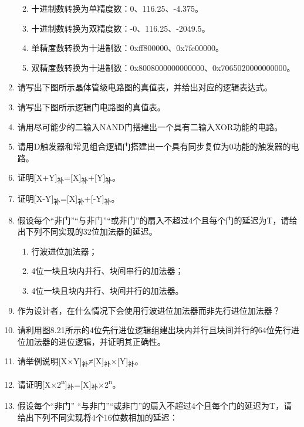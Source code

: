 \documentclass[]{ctexbook}
\providecommand{\tightlist}{%
  \setlength{\itemsep}{0pt}\setlength{\parskip}{0pt}}
\begin{document}
\begin{enumerate}
  \begin{enumerate}
  \def\labelenumii{\alph{enumii})}
  \tightlist
  \item
    十进制数转换为单精度数：0、116.25、-4.375。
  \item
    十进制数转换为双精度数：-0、116.25、-2049.5。
  \item
    单精度数转换为十进制数：0xff800000、0x7fe00000。
  \item
    双精度数转换为十进制数：0x8008000000000000、0x7065020000000000。
  \end{enumerate}
\item
  请写出下图所示晶体管级电路图的真值表，并给出对应的逻辑表达式。
\item
  请写出下图所示逻辑门电路图的真值表。
\item
  请用尽可能少的二输入NAND门搭建出一个具有二输入XOR功能的电路。
\item
  请用D触发器和常见组合逻辑门搭建出一个具有同步复位为0功能的触发器的电路。
\item
  证明{[}X+Y{]}\textsubscript{补}={[}X{]}\textsubscript{补}+{[}Y{]}\textsubscript{补}。
\item
  证明{[}X-Y{]}\textsubscript{补}={[}X{]}\textsubscript{补}+{[}-Y{]}\textsubscript{补}。
\item
  假设每个``非门''``与非门''``或非门''的扇入不超过4个且每个门的延迟为T，请给出下列不同实现的32位加法器的延迟。

  \begin{enumerate}
  \def\labelenumii{\alph{enumii})}
  \tightlist
  \item
    行波进位加法器；
  \item
    4位一块且块内并行、块间串行的加法器；
  \item
    4位一块且块内并行、块间并行的加法器。
  \end{enumerate}
\item
  作为设计者，在什么情况下会使用行波进位加法器而非先行进位加法器？
\item
  请利用图8.21所示的4位先行进位逻辑组建出块内并行且块间并行的64位先行进位加法器的进位逻辑，并证明其正确性。
\item
  请举例说明{[}X×Y{]}\textsubscript{补}≠{[}X{]}\textsubscript{补}×{[}Y{]}\textsubscript{补}。
\item
  请证明{[}X×2\textsuperscript{n}{]}\textsubscript{补}={[}X{]}\textsubscript{补}×2\textsuperscript{n}。
\item
  假设每个``非门'' ``与非门''``或非门''的扇入不超过4个且每个门的延迟为T，请给出下列不同实现将4个16位数相加的延迟：


\end{enumerate}
\end{document}

